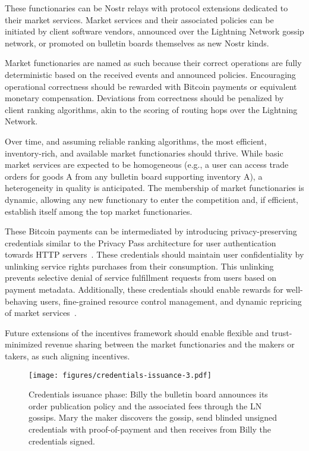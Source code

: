 \documentclass[pdflatex,sn-mathphys]{sn-jnl}%
\theoremstyle{thmstyleone}%
\theoremstyle{thmstyletwo}%
\theoremstyle{thmstylethree}%
\begin{document}
These functionaries can be Nostr relays with protocol extensions dedicated to their market services. Market services and their associated policies can be initiated by client software vendors, announced over the Lightning Network gossip network, or promoted on bulletin boards themselves as new Nostr kinds.

Market functionaries are named as such because their correct operations are fully deterministic based on the received events and announced policies. Encouraging operational correctness should be rewarded with Bitcoin payments or equivalent monetary compensation. Deviations from correctness should be penalized by client ranking algorithms, akin to the scoring of routing hops over the Lightning Network.

Over time, and assuming reliable ranking algorithms, the most efficient, inventory-rich, and available market functionaries should thrive. While basic market services are expected to be homogeneous (e.g., a user can access trade orders for goods A from any bulletin board supporting inventory A), a heterogeneity in quality is anticipated. The membership of market functionaries is dynamic, allowing any new functionary to enter the competition and, if efficient, establish itself among the top market functionaries.

These Bitcoin payments can be intermediated by introducing privacy-preserving credentials similar to the Privacy Pass architecture for user authentication towards HTTP servers~\cite{Privacy2018Davidson}. 
These credentials should maintain user confidentiality by unlinking service rights purchases from their consumption. This unlinking prevents selective denial of service fulfillment requests from users based on payment metadata. Additionally, these credentials should enable rewards for well-behaving users, fine-grained resource control management, and dynamic repricing of market services~\cite{Staking2022Optech}.

Future extensions of the incentives framework should enable flexible and trust-minimized revenue sharing between the market functionaries and the makers or takers, as such aligning incentives.

\begin{figure}[h]
    \centering
    \texttt{[image: figures/credentials-issuance-3.pdf]}
    \caption{Credentials issuance phase: Billy the bulletin board announces its order publication policy and the associated fees through the LN gossips. Mary the maker discovers the gossip, send blinded unsigned credentials with proof-of-payment and then receives from Billy the credentials signed.}
    \label{fig:issuance}
\end{figure}
\end{document}
